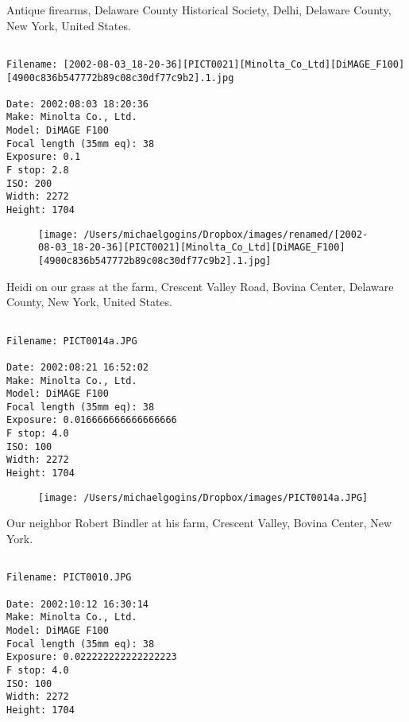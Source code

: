 \documentclass[11pt,letter,DIV=14,paper=landscape]{scrbook}
\begin{document}
\clearpage
\noindent Antique firearms, Delaware County Historical Society, Delhi, Delaware County, New York, United States.
\noindent
\begin{lstlisting}

Filename: [2002-08-03_18-20-36][PICT0021][Minolta_Co_Ltd][DiMAGE_F100][4900c836b547772b89c08c30df77c9b2].1.jpg

Date: 2002:08:03 18:20:36
Make: Minolta Co., Ltd.
Model: DiMAGE F100
Focal length (35mm eq): 38
Exposure: 0.1
F stop: 2.8
ISO: 200
Width: 2272
Height: 1704
\end{lstlisting}
\clearpage

\begin{figure}
\texttt{[image: /Users/michaelgogins/Dropbox/images/renamed/[2002-08-03\_18-20-36][PICT0021][Minolta\_Co\_Ltd][DiMAGE\_F100][4900c836b547772b89c08c30df77c9b2].1.jpg]}
\end{figure}
    
\clearpage
\noindent Heidi on our grass at the farm, Crescent Valley Road, Bovina Center, Delaware County, New York, United States.
\noindent
\begin{lstlisting}

Filename: PICT0014a.JPG

Date: 2002:08:21 16:52:02
Make: Minolta Co., Ltd.
Model: DiMAGE F100
Focal length (35mm eq): 38
Exposure: 0.016666666666666666
F stop: 4.0
ISO: 100
Width: 2272
Height: 1704
\end{lstlisting}
\clearpage

\begin{figure}
\texttt{[image: /Users/michaelgogins/Dropbox/images/PICT0014a.JPG]}
\end{figure}
    
\clearpage
\noindent Our neighbor Robert Bindler at his farm, Crescent Valley, Bovina Center, New York.
\noindent
\begin{lstlisting}

Filename: PICT0010.JPG

Date: 2002:10:12 16:30:14
Make: Minolta Co., Ltd.
Model: DiMAGE F100
Focal length (35mm eq): 38
Exposure: 0.022222222222222223
F stop: 4.0
ISO: 100
Width: 2272
Height: 1704
\end{lstlisting}
\clearpage
\end{document}

